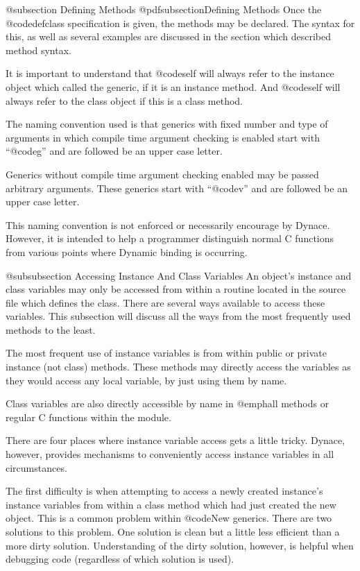 @subsection Defining Methods
@pdfsubsection{Defining Methods}
Once the @code{defclass} specification is given, the methods may be
declared.  The syntax for this, as well as several examples are discussed
in the section which described method syntax.

It is important to understand that @code{self} will always refer to the
instance object which called the generic, if it is an instance method.
And @code{self} will always refer to the class object if this is a
class method.

The naming convention used is that generics with fixed number and
type of arguments in which compile time argument checking is enabled
start with ``@code{g}'' and are followed be an upper case letter.

Generics without compile time argument checking enabled may be passed
arbitrary arguments.  These generics start with ``@code{v}'' and are
followed be an upper case letter.

This naming convention is not enforced or necessarily encourage by
Dynace.  However, it is intended to help a programmer distinguish normal
C functions from various points where Dynamic binding is occurring.


@subsubsection Accessing Instance And Class Variables
An object's instance and class variables may only be accessed from
within a routine located in the source file which defines the class.
There are several ways available to access these variables.  This
subsection will discuss all the ways from the most frequently used
methods to the least.

The most frequent use of instance variables is from within public or
private instance (not class) methods.  These methods may directly access
the variables as they would access any local variable, by just using
them by name.

Class variables are also directly accessible by name in @emph{all}
methods or regular C functions within the module.

There are four places where instance variable access gets a little tricky.
Dynace, however, provides mechanisms to conveniently access instance
variables in all circumstances.

The first difficulty is when attempting to access a newly created instance's
instance variables from within a class method which had just created the
new object.  This is a common problem within @code{New} generics.  There
are two solutions to this problem.  One solution is clean but a little
less efficient than a more dirty solution.  Understanding of the dirty
solution, however, is helpful when debugging code (regardless of which
solution is used).

